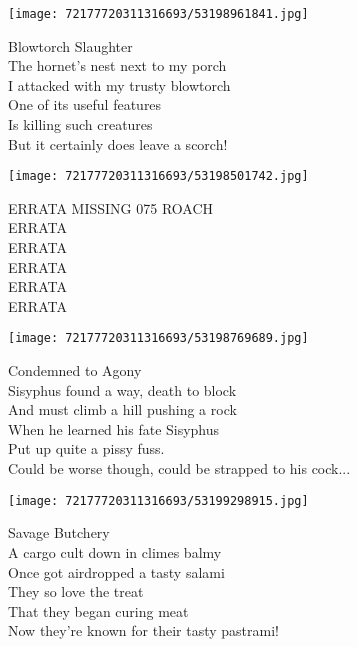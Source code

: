 \documentclass[10pt,letterpaper]{article}
\begin{document}
\begin{center}\texttt{[image: 72177720311316693/53198961841.jpg]}
\end{center}
\begin{center}
Blowtorch Slaughter\\
\vskip 0.2in
The hornet's nest next to my porch\\
I attacked with my trusty blowtorch\\
One of its useful features\\
Is killing such creatures\\
But it certainly does leave a scorch!\\
\end{center}
\pagebreak

\begin{center}\texttt{[image: 72177720311316693/53198501742.jpg]}
\end{center}
\begin{center}
ERRATA MISSING 075 ROACH\\
\vskip 0.2in
ERRATA\\
ERRATA\\
ERRATA\\
ERRATA\\
ERRATA\\
\end{center}
\pagebreak

\begin{center}
\texttt{[image: 72177720311316693/53198769689.jpg]}
\end{center}

\begin{center}
Condemned to Agony\\
\vskip 0.2in
Sisyphus found a way, death to block\\
And must climb a hill pushing a rock\\
When he learned his fate Sisyphus\\
Put up quite a pissy fuss.\\
Could be worse though, could be strapped to his cock...\\
\end{center}
\pagebreak

\begin{center}\texttt{[image: 72177720311316693/53199298915.jpg]}
\end{center}
\begin{center}
Savage Butchery\\
\vskip 0.2in
A cargo cult down in climes balmy\\
Once got airdropped a tasty salami\\
They so love the treat\\
That they began curing meat\\
Now they're known for their tasty pastrami!\\
\end{center}
\pagebreak
\end{document}
